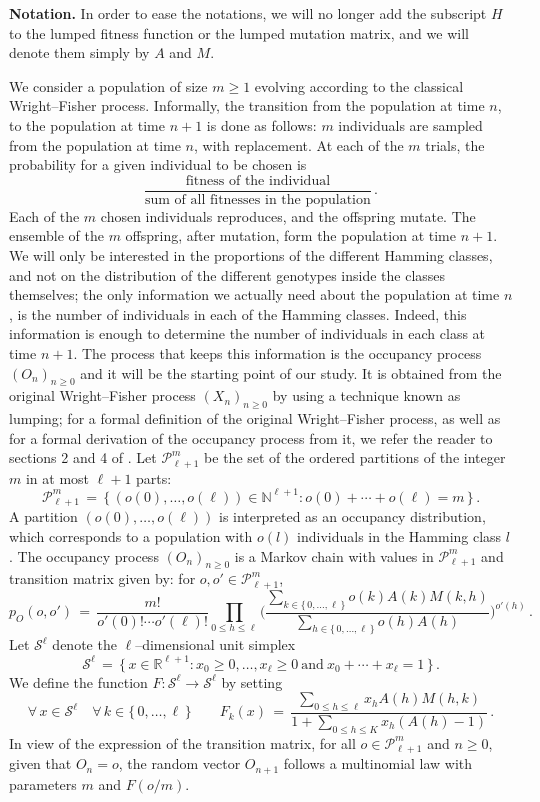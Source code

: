 \documentclass[a4paper,12pt]{article}
\theoremstyle{definition}
\theoremstyle{remark}
\def \cP {\mathcal{P}}
\def \cS {\mathcal{S}}
\def \N {\mathbb{N}}
\def \R {\mathbb{R}}
\def \lra {\longrightarrow}
\def \Ot {(O_n)_{n\geq 0}}
\def \pml {\cP^m_{\ell +1}}
\def \zl {\{\, 0,\dots,\ell \,\}}
\begin{document}
\textbf{Notation.} In order to ease the notations,
we will no longer add the subscript $H$ to the lumped fitness function
or the lumped mutation matrix, and we will denote them simply by $A$ and $M$.

We consider a population of size $m\geq 1$ evolving according to the classical Wright--Fisher process.
Informally, the transition from the population at time $n$,
to the population at time $n+1$ is done as follows:
$m$ individuals are sampled from the population at time $n$, with replacement.
At each of the $m$ trials, the probability for a given individual to be chosen
is 
$$\frac{\text{fitness of the individual}}{\text{sum of all fitnesses in the population}}\,.$$
Each of the $m$ chosen individuals reproduces, and the offspring mutate.
The ensemble of the $m$ offspring, after mutation, form the population at time $n+1$.
We will only be interested in the proportions of the different Hamming classes,
and not on the distribution of the different genotypes inside the classes themselves;
the only information we actually need about the population at time $n$,
is the number of individuals in each of the Hamming classes.
Indeed, this information is enough to determine the number of individuals in each class at time $n+1$.
The process that keeps this information is
the occupancy process
$\Ot$ and it
will be the starting point of our study.
It is obtained from the original Wright--Fisher process
$(X_n)_{n\geq 0}$
by using a technique known as lumping;
for a formal definition of the original Wright--Fisher process,
as well as for a formal derivation of the occupancy process from it,
we refer the reader to sections 2 and 4 of \cite{CerfWF}.
\color{black}
Let $\pml$ be the set of the ordered partitions 
of the integer $m$ in at most $\ell+1$ parts:
$$
\pml\,=\,
\big\lbrace\,
(o(0),\dots,o(\ell))\in\N^{\ell+1}:
o(0)+\cdots+o(\ell)=m
\,\big\rbrace\,.
$$
A partition $(o(0),\dots,o(\ell))$
is interpreted as an occupancy distribution,
which corresponds to a population with $o(l)$ 
individuals in the Hamming class $l$.
The occupancy process $\Ot$
is a Markov chain with values in $\pml$
and transition matrix given by:
for $ o,o'\in\pml$,
$$
p_O(o,o')\,=\,
\frac{m!}{o'(0)!\cdots o'(\ell)!}
\prod_{0\leq h\leq\ell}\Bigg(
\frac{\sum_{k\in\zl}o(k)A(k)M(k,h)}{\sum_{h\in\zl}o(h)A(h)}
\Bigg)^{o'(h)}\,.
$$
Let $\cS^\ell$ denote the $\ell$--dimensional unit simplex 
$$\cS^\ell\,=\,\big\lbrace\,
x\in\R^{\ell+1}:x_0\geq0,\dots,x_\ell\geq0\ \text{and}\
x_0+\cdots+x_\ell=1
\,\big\rbrace\,.$$
We define the function $F:\cS^{\ell}\lra\cS^{\ell}$ by
setting
$$\forall\, x\in\cS^{\ell}\quad \forall\, k\in\zl\qquad
F_k(x)\,=\,\frac{\displaystyle\sum_{0\leq h\leq\ell}
x_hA(h)M(h,k)}
{\displaystyle 1+\sum_{0\leq h\leq K}
x_h(A(h)-1)}\,.
$$
In view of the expression of the transition matrix,
for all $o\in\pml$ and $n\geq0$,
given that $O_n=o$, the random vector $O_{n+1}$
follows a multinomial law with parameters $m$ and $F(o/m)$.
\end{document}
